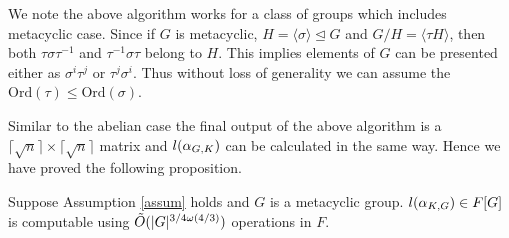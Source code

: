 We note the above algorithm works for a class of groups which includes metacyclic case. Since if $G$ is metacyclic, 
$H = \langle \sigma \rangle \unlhd G$ and $G/H = \langle \tau H \rangle$, then both $\tau \sigma \tau^{-1}$ and 
$\tau^{-1} \sigma \tau$ belong to $H$. This implies elements of $G$ can be presented either as $\sigma^i\tau^j$
or $\tau^j\sigma^i$. Thus without loss of generality we can assume the $\textrm{Ord}(\tau) \leq \textrm{Ord}(\sigma)$.

Similar to the abelian case the final output of the above algorithm is a $\lceil \sqrt{n} \rceil \times \lceil \sqrt{n} \rceil $
matrix and $l(\alpha_{G,K})$ can be calculated in the same way. Hence we have proved the following proposition.
 
\begin{proposition}
Suppose Assumption \ref{assum} holds and $G$ is a metacyclic group. $l(\alpha_{K,G}) \in F[G]$ is computable using $\tilde{O}(\vert G \vert ^{3/4 \omega(4/3)})$ 
operations in $F$.
\end{proposition}

